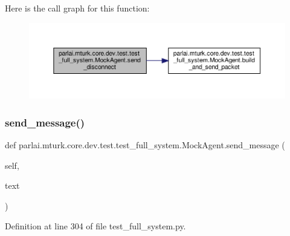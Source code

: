 Here is the call graph for this function\+:
\nopagebreak
\begin{figure}[H]
\begin{center}
\leavevmode
\includegraphics[width=350pt]{classparlai_1_1mturk_1_1core_1_1dev_1_1test_1_1test__full__system_1_1MockAgent_a0ae8ffc34c8a563239335eac90dfa9ac_cgraph}
\end{center}
\end{figure}
\mbox{\label{classparlai_1_1mturk_1_1core_1_1dev_1_1test_1_1test__full__system_1_1MockAgent_ad083e4d20ea195735ab6694723a65ebd}} 
\subsubsection{\texorpdfstring{send\+\_\+message()}{send\_message()}}
{\footnotesize\ttfamily def parlai.\+mturk.\+core.\+dev.\+test.\+test\+\_\+full\+\_\+system.\+Mock\+Agent.\+send\+\_\+message (\begin{DoxyParamCaption}\item[{}]{self,  }\item[{}]{text }\end{DoxyParamCaption})}



Definition at line 304 of file test\+\_\+full\+\_\+system.\+py.



